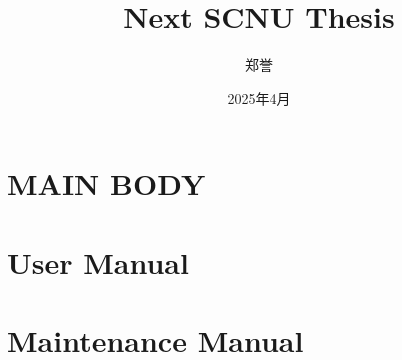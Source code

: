 \documentclass{NEXT-SCNUThesis}
\title{Next SCNU Thesis} %
\author{郑誉} %
\institute{xxx} %
\date{2025年4月} %
\begin{document}
    \maketitle

    \begin{abstracten}
    \end{abstracten}

    \begin{abstractzh}
    \end{abstractzh}

    \toc

    \chapter{MAIN BODY}


    \appendix
    \chapter{User Manual}
    \chapter{Maintenance Manual}

    \acknowledgements
\end{document}
